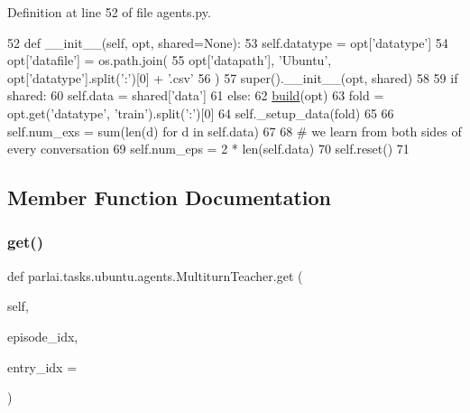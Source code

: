 Definition at line 52 of file agents.\+py.


\begin{DoxyCode}
52     \textcolor{keyword}{def }\_\_init\_\_(self, opt, shared=None):
53         self.datatype = opt[\textcolor{stringliteral}{'datatype'}]
54         opt[\textcolor{stringliteral}{'datafile'}] = os.path.join(
55             opt[\textcolor{stringliteral}{'datapath'}], \textcolor{stringliteral}{'Ubuntu'}, opt[\textcolor{stringliteral}{'datatype'}].split(\textcolor{stringliteral}{':'})[0] + \textcolor{stringliteral}{'.csv'}
56         )
57         super().\_\_init\_\_(opt, shared)
58 
59         \textcolor{keywordflow}{if} shared:
60             self.data = shared[\textcolor{stringliteral}{'data'}]
61         \textcolor{keywordflow}{else}:
62             \hyperlink{namespaceparlai_1_1mturk_1_1tasks_1_1talkthewalk_1_1download_a8c0fbb9b6dfe127cb8c1bd6e7c4e33fd}{build}(opt)
63             fold = opt.get(\textcolor{stringliteral}{'datatype'}, \textcolor{stringliteral}{'train'}).split(\textcolor{stringliteral}{':'})[0]
64             self.\_setup\_data(fold)
65 
66         self.num\_exs = sum(len(d) \textcolor{keywordflow}{for} d \textcolor{keywordflow}{in} self.data)
67 
68         \textcolor{comment}{# we learn from both sides of every conversation}
69         self.num\_eps = 2 * len(self.data)
70         self.reset()
71 
\end{DoxyCode}


\subsection{Member Function Documentation}
\mbox{\label{classparlai_1_1tasks_1_1ubuntu_1_1agents_1_1MultiturnTeacher_a4cd01e6122097e56524a2976f8aacfa6}} 
\subsubsection{\texorpdfstring{get()}{get()}}
{\footnotesize\ttfamily def parlai.\+tasks.\+ubuntu.\+agents.\+Multiturn\+Teacher.\+get (\begin{DoxyParamCaption}\item[{}]{self,  }\item[{}]{episode\+\_\+idx,  }\item[{}]{entry\+\_\+idx = {} }\end{DoxyParamCaption})}



